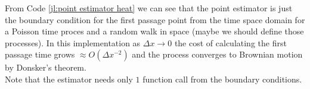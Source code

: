 \documentclass[a4paper,12pt]{article}
\begin{document}
\begin{julia}\label{jl:point estimator heat}
\end{julia}

From Code \ref{jl:point estimator heat} we can see that the point estimator is just the boundary condition
for the first passage point from the time space domain for a Poisson time proces and a random walk in space
(maybe we should define those processes).
In this implementation as  $\Delta x \rightarrow 0$  the cost of calculating the first passage time grows
$\approx O(\Delta x ^{-2})$ and the process converges to Brownian motion by Donsker's theorem. \\
Note that the estimator needs only $1$ function call from the boundary conditions.







\end{document}
